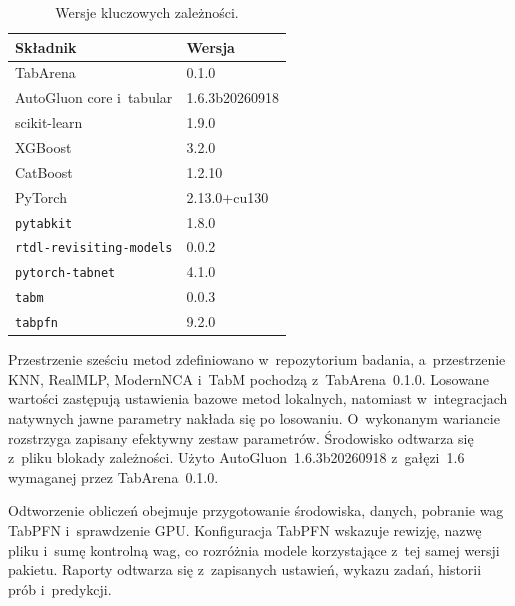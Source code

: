 \begin{table}[!htbp]
\centering\small
\caption{Wersje kluczowych zależności.}
\label{tab:wersje}
\begin{tabular}{@{}ll@{}}
\toprule
Składnik & Wersja \\
\midrule
TabArena & 0.1.0 \\
AutoGluon core i~tabular & 1.6.3b20260918 \\
scikit-learn & 1.9.0 \\
XGBoost & 3.2.0 \\
CatBoost & 1.2.10 \\
PyTorch & 2.13.0+cu130 \\
\texttt{pytabkit} & 1.8.0 \\
\texttt{rtdl-revisiting-models} & 0.0.2 \\
\texttt{pytorch-tabnet} & 4.1.0 \\
\texttt{tabm} & 0.0.3 \\
\texttt{tabpfn} & 9.2.0 \\
\bottomrule
\end{tabular}
\end{table}

Przestrzenie sześciu metod zdefiniowano w~repozytorium badania, a~przestrzenie KNN, RealMLP, ModernNCA i~TabM pochodzą z~TabArena~0.1.0. Losowane wartości zastępują ustawienia bazowe metod lokalnych, natomiast w~integracjach natywnych jawne parametry nakłada się po losowaniu. O~wykonanym wariancie rozstrzyga zapisany efektywny zestaw parametrów. Środowisko odtwarza się z~pliku blokady zależności. Użyto AutoGluon~1.6.3b20260918 z~gałęzi~1.6 wymaganej przez TabArena~0.1.0.

Odtworzenie obliczeń obejmuje przygotowanie środowiska, danych, pobranie wag TabPFN i~sprawdzenie GPU. Konfiguracja TabPFN wskazuje rewizję, nazwę pliku i~sumę kontrolną wag, co rozróżnia modele korzystające z~tej samej wersji pakietu. Raporty odtwarza się z~zapisanych ustawień, wykazu zadań, historii prób i~predykcji.
